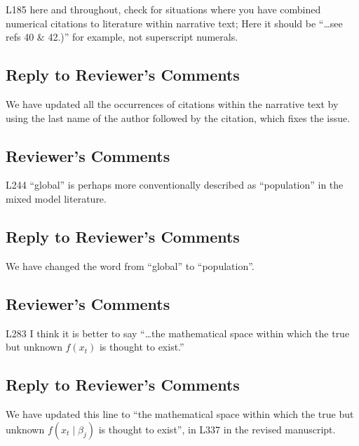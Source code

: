 \documentclass[
]{article}
\begin{document}
L185 here and throughout, check for situations where you have combined numerical citations to literature within narrative text; Here it should be ``\ldots see refs 40 \& 42.)'' for example, not superscript numerals.

\hypertarget{section-21}{%
\subsection{\texorpdfstring{\textcolor{reviewersblue} {Reply to Reviewer's Comments}}{}}\label{section-21}}

We have updated all the occurrences of citations within the narrative text by using the last name of the author followed by the citation, which fixes the issue.

\hypertarget{reviewers-comments-21}{%
\subsection{Reviewer's Comments}\label{reviewers-comments-21}}

L244 ``global'' is perhaps more conventionally described as ``population'' in the mixed model literature.

\hypertarget{section-22}{%
\subsection{\texorpdfstring{\textcolor{reviewersblue} {Reply to Reviewer's Comments}}{}}\label{section-22}}

We have changed the word from ``global'' to ``population''.

\hypertarget{reviewers-comments-22}{%
\subsection{Reviewer's Comments}\label{reviewers-comments-22}}

L283 I think it is better to say ``\ldots the mathematical space within which the true but unknown \(f(x_t)\) is thought to exist.''

\hypertarget{section-23}{%
\subsection{\texorpdfstring{\textcolor{reviewersblue} {Reply to Reviewer's Comments}}{}}\label{section-23}}

We have updated this line to ``the mathematical space within which the true but unknown \(f(x_t\mid \beta_j)\) is thought to exist'', in L337 in the revised manuscript.
\end{document}
